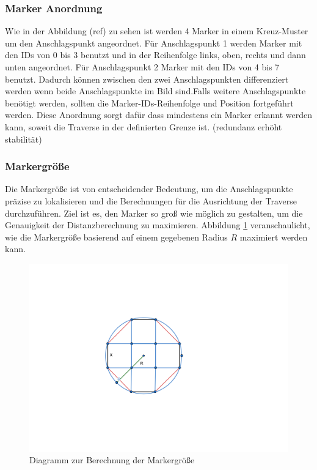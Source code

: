 \subsubsection{Marker Anordnung}

Wie in der Abbildung (ref) zu sehen ist werden 4 Marker in einem Kreuz-Muster um den Anschlagspunkt angeordnet. Für Anschlagspunkt 1 werden Marker mit den IDs von 0 bis 3 benutzt und in der Reihenfolge links, oben, rechts und dann unten angeordnet. Für Anschlagspunkt 2 Marker mit den IDs von 4 bis 7 benutzt. Dadurch können zwischen den zwei Anschlagspunkten differenziert werden wenn beide Anschlagspunkte im Bild sind.Falls weitere Anschlagspunkte benötigt werden, sollten die Marker-IDs-Reihenfolge und Position fortgeführt werden. Diese Anordnung sorgt dafür dass mindestens ein Marker erkannt werden kann, soweit die Traverse in der definierten Grenze ist. 
(redundanz erhöht stabilität)

\clearpage
\subsubsection{Markergröße}

Die Markergröße ist von entscheidender Bedeutung, um die Anschlagspunkte präzise 
zu lokalisieren und die Berechnungen für die Ausrichtung der Traverse durchzuführen. 
Ziel ist es, den Marker so groß wie möglich zu gestalten, um die Genauigkeit der 
Distanzberechnung zu maximieren. Abbildung \ref{fig:marker} veranschaulicht, wie die Markergröße 
basierend auf einem gegebenen Radius \( R \) maximiert werden kann.

\begin{figure}[H]
    \centering
    \includegraphics[width=\linewidth]{graphics/marker.png}
    \caption{Diagramm zur Berechnung der Markergröße}
    \label{fig:marker}
\end{figure}

